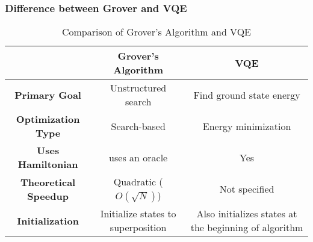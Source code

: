 \documentclass{Assignment}
\begin{document}
\subsubsection*{Difference between Grover and VQE}
\begin{table}[hbt!]
	\centering
	\caption{Comparison of Grover's Algorithm and VQE}
	\label{tab:grover_vqe_comparison}
	\begin{adjustbox}{max width=\textwidth}
		\begin{tabular}{|c|c|c|}
			\toprule
		
			& \textbf{Grover's Algorithm} & \textbf{VQE} \\
			\midrule
			\textbf{Primary Goal} & Unstructured search & Find ground state energy \\
			\hline
			\textbf{Optimization Type} & Search-based & Energy minimization \\
			\hline
			\textbf{Uses Hamiltonian} &uses an oracle & Yes \\
			\hline
			\textbf{Theoretical Speedup} & Quadratic ($O(\sqrt{N})$) & Not specified\\
	
			\hline
			\textbf{Initialization} & Initialize states to superposition & Also initializes states at the beginning of algorithm  \\
			\bottomrule
		\end{tabular}
	\end{adjustbox}
\end{table}
\newpage

\end{document}
